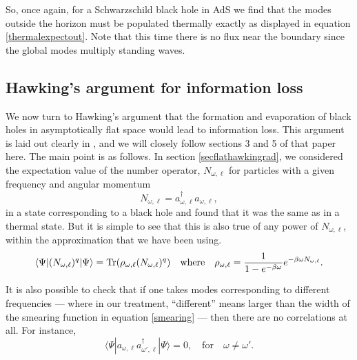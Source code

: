 \documentclass[12pt]{article}
\def\schwarzn{N}
\def\tr{{\rm Tr}}
\newcommand{\be}{\begin{equation}}
\newcommand{\ee}{\end{equation}}
\begin{document}
So, once again, for a Schwarzschild black hole in AdS we find that the modes outside the horizon must be populated thermally exactly as displayed in equation \eqref{thermalexpectout}.
Note that this time there is no flux near the boundary since the global modes multiply standing waves.






\subsection{Hawking's argument for information loss \label{sechawkingparadox}}
We now turn to Hawking's argument that the formation and evaporation of black holes in asymptotically flat space would lead to information loss. This argument is laid out clearly in \cite{Hawking:1976ra}, and we will closely follow  sections 3 and 5 of that paper here.
The main point is as follows.  In section \ref{secflathawkingrad}, we considered the expectation value of the number operator, $\schwarzn_{\omega, \ell}$ for particles with a given frequency and angular momentum
\be
\label{schwarzndef}
\schwarzn_{\omega, \ell} = a_{\omega, \ell}^{\dagger} a_{\omega, \ell},
\ee
in a state corresponding to a black hole and found that it was the same as in a  thermal state.  But it is simple to see that this is also true of any power of $\schwarzn_{\omega, \ell}$, within the approximation that we have been using.
\be
\label{thermaldensity}
\langle \Psi | (\schwarzn_{\omega, \ell})^q|\Psi \rangle = \tr(\rho_{\omega, \ell} (\schwarzn_{\omega, \ell})^q) \quad \text{where} \quad \rho_{\omega, \ell} = {1 \over 1 - e^{-\beta \omega}}  e^{-\beta \omega \schwarzn_{\omega, \ell}}.
\ee

It is also possible to check that if one takes modes corresponding to different frequencies --- where in our treatment, ``different'' means larger than the width of the smearing function in equation \eqref{smearing} --- then there are no correlations at all.  For instance,
\be
\label{uncorrelated}
\langle \Psi | a_{\omega, \ell} a_{\omega', \ell}^{\dagger} |\Psi  \rangle = 0, \quad \text{for} \quad \omega \neq \omega'.
\ee
\end{document}
